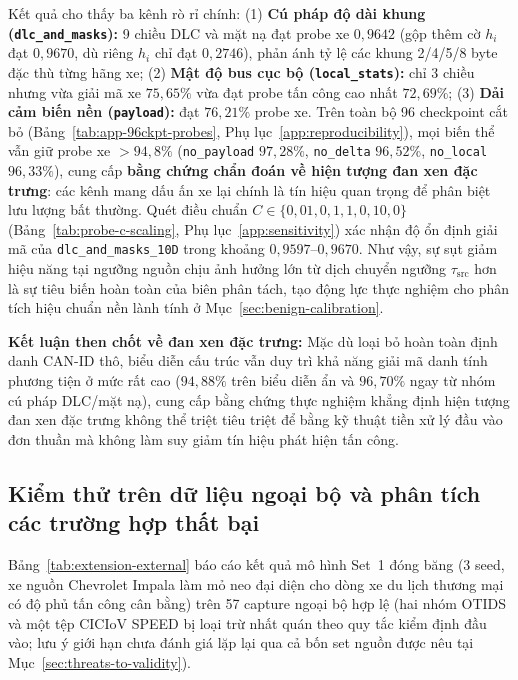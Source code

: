 \documentclass[12pt, a4paper, reqno, oneside]{book}
\DeclareRobustCommand{\code}[1]{\nolinkurl{#1}}
\begin{document}
Kết quả cho thấy ba kênh rò rỉ chính: (1) \textbf{Cú pháp độ dài khung (\code{dlc\_and\_masks}):} 9 chiều DLC và mặt nạ đạt probe xe $0{,}9642$ (gộp thêm cờ $h_i$ đạt $0{,}9670$, dù riêng $h_i$ chỉ đạt $0{,}2746$), phản ánh tỷ lệ các khung 2/4/5/8 byte đặc thù từng hãng xe; (2) \textbf{Mật độ bus cục bộ (\code{local\_stats}):} chỉ 3 chiều nhưng vừa giải mã xe $75{,}65\%$ vừa đạt probe tấn công cao nhất $72{,}69\%$; (3) \textbf{Dải cảm biến nền (\code{payload}):} đạt $76{,}21\%$ probe xe. Trên toàn bộ 96 checkpoint cắt bỏ (Bảng~\ref{tab:app-96ckpt-probes}, Phụ lục~\ref{app:reproducibility}), mọi biến thể vẫn giữ probe xe $>94{,}8\%$ (\code{no\_payload} $97{,}28\%$, \code{no\_delta} $96{,}52\%$, \code{no\_local} $96{,}33\%$), cung cấp \textbf{bằng chứng chẩn đoán về hiện tượng đan xen đặc trưng}: các kênh mang dấu ấn xe lại chính là tín hiệu quan trọng để phân biệt lưu lượng bất thường. Quét điều chuẩn $C \in \{0{,}01, 0{,}1, 1{,}0, 10{,}0\}$ (Bảng~\ref{tab:probe-c-scaling}, Phụ lục~\ref{app:sensitivity}) xác nhận độ ổn định giải mã của \code{dlc\_and\_masks\_10D} trong khoảng $0{,}9597\text{--}0{,}9670$. Như vậy, sự sụt giảm hiệu năng tại ngưỡng nguồn chịu ảnh hưởng lớn từ dịch chuyển ngưỡng $\tau_{\text{src}}$ hơn là sự tiêu biến hoàn toàn của biên phân tách, tạo động lực thực nghiệm cho phân tích hiệu chuẩn nền lành tính ở Mục~\ref{sec:benign-calibration}.

\noindent\textbf{Kết luận then chốt về đan xen đặc trưng:} Mặc dù loại bỏ hoàn toàn định danh CAN-ID thô, biểu diễn cấu trúc vẫn duy trì khả năng giải mã danh tính phương tiện ở mức rất cao ($94{,}88\%$ trên biểu diễn ẩn và $96{,}70\%$ ngay từ nhóm cú pháp DLC/mặt nạ), cung cấp bằng chứng thực nghiệm khẳng định hiện tượng đan xen đặc trưng không thể triệt tiêu triệt để bằng kỹ thuật tiền xử lý đầu vào đơn thuần mà không làm suy giảm tín hiệu phát hiện tấn công.

\subsection{Kiểm thử trên dữ liệu ngoại bộ và phân tích các trường hợp thất bại}\label{sec:eval-external}
Bảng~\ref{tab:extension-external} báo cáo kết quả mô hình Set~1 đóng băng (3 seed, xe nguồn Chevrolet Impala làm mỏ neo đại diện cho dòng xe du lịch thương mại có độ phủ tấn công cân bằng) trên 57 capture ngoại bộ hợp lệ (hai nhóm OTIDS và một tệp CICIoV SPEED bị loại trừ nhất quán theo quy tắc kiểm định đầu vào; lưu ý giới hạn chưa đánh giá lặp lại qua cả bốn set nguồn được nêu tại Mục~\ref{sec:threats-to-validity}).
\end{document}
